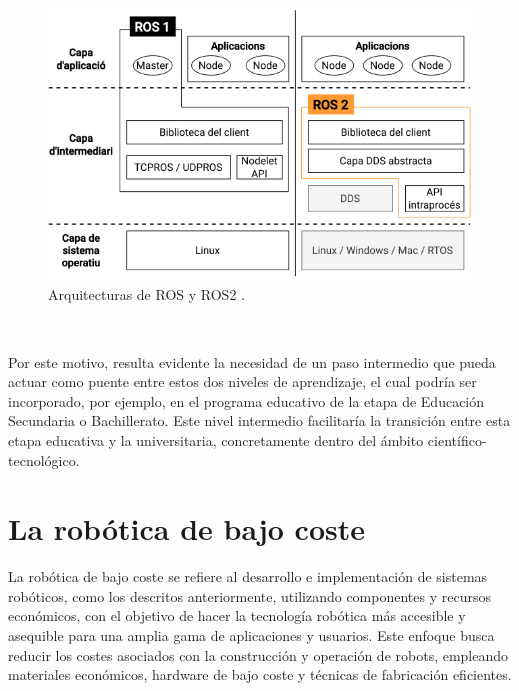 \begin{figure} [h!]
  \begin{center}
    \includegraphics[width=12cm]{figs/ROS_and_ROS2}
  \end{center}
  \caption{Arquitecturas de ROS y ROS2 \cite{ros_ros2}.}
  \label{fig:ros}
\end{figure}\

Por este motivo, resulta evidente la necesidad de un paso intermedio que pueda
actuar como puente entre estos dos niveles de aprendizaje, el cual podría ser
incorporado, por ejemplo, en el programa educativo de la etapa de Educación
Secundaria o Bachillerato.
Este nivel intermedio facilitaría la transición entre esta etapa educativa y la
universitaria, concretamente dentro del ámbito científico-tecnológico.



\section{La robótica de bajo coste}
\label{sec:robotica_bajo_coste} %

La robótica de bajo coste se refiere al desarrollo e implementación de sistemas
robóticos, como los descritos anteriormente, utilizando componentes y recursos
económicos, con el objetivo de hacer la tecnología robótica más accesible y
asequible para una amplia gama de aplicaciones y usuarios.
Este enfoque busca reducir los costes asociados con la construcción y operación
de robots, empleando materiales económicos, hardware de bajo coste y técnicas
de fabricación eficientes.
\\

